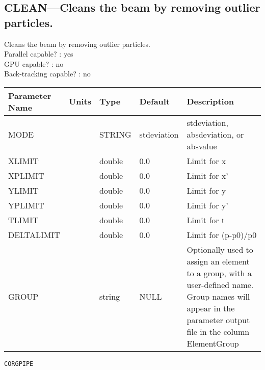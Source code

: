 \subsection{CLEAN---Cleans the beam by removing outlier particles.}
Cleans the beam by removing outlier particles.
\\
Parallel capable? : yes\\
GPU capable? : no\\
Back-tracking capable? : no\\
\begin{tabular}{|l|l|l|l|p{\descwidth}|} \hline
Parameter Name & Units & Type & Default & Description \\ \hline 
MODE &  & STRING &   stdeviation     & stdeviation, absdeviation, or absvalue  \\ \hline 
XLIMIT &  & double &  0.0 & Limit for x  \\ \hline 
XPLIMIT &  & double &  0.0 & Limit for x'  \\ \hline 
YLIMIT &  & double &  0.0 & Limit for y  \\ \hline 
YPLIMIT &  & double &  0.0 & Limit for y'  \\ \hline 
TLIMIT &  & double &  0.0 & Limit for t  \\ \hline 
DELTALIMIT &  & double &  0.0 & Limit for (p-p0)/p0  \\ \hline 
GROUP &  & string & NULL & Optionally used to assign an element to a group, with a user-defined name.  Group names will appear in the parameter output file in the column ElementGroup  \\ \hline 
\end{tabular}

\vspace*{0.5in}

\newpage
\begin{center}{\Large\verb|CORGPIPE|}\end{center}
